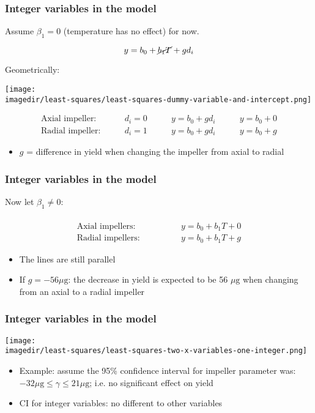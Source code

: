 \begin{frame}\frametitle{Integer variables in the model}

	Assume $\beta_1 = 0$ (temperature has no effect) for now.
	
	$$y = b_0 + \cancel{b_1 T} + g d_i$$
	
	Geometrically: \vspace{-0.5cm}
	\begin{center}
		\texttt{[image: \\imagedir/least-squares/least-squares-dummy-variable-and-intercept.png]}
	\end{center}
	$$
	\begin{array}{llll}
		\text{Axial impeller:} \qquad & d_i=0 &\qquad y = b_0 + gd_i &\qquad y = b_0 + 0 \\
		\text{Radial impeller:} \qquad & d_i=1 &\qquad y = b_0 + gd_i & \qquad y = b_0 + g
	\end{array}
	$$
	\begin{itemize}
		\item	$g$ = difference in yield when changing the impeller from axial to radial
	\end{itemize}
\end{frame}

\begin{frame}\frametitle{Integer variables in the model}

	Now let $\beta_1 \neq 0$:

	$$
	\begin{array}{ll}
		& \\
		\text{Axial impellers:} \qquad &\qquad y = b_0 + b_1 T + 0 \\
		\text{Radial impellers:} \qquad &\qquad y = b_0 + b_1 T + g
	\end{array}
	$$
	\begin{itemize}
		\item	The lines are still parallel
		\item	If $g = -56 \mu\text{g}$: the decrease in yield is expected to be 56 $\mu\text{g}$ when changing from an axial to a radial impeller
	\end{itemize}
\end{frame}

\begin{frame}\frametitle{Integer variables in the model}
	\begin{center}
		\texttt{[image: \\imagedir/least-squares/least-squares-two-x-variables-one-integer.png]}
	\end{center}
	\begin{itemize}
		\item	Example: assume the 95\% confidence interval for impeller parameter was: $ -32 \mu\text{g} \leq \gamma \leq 21 \mu\text{g}$; i.e. no significant effect on yield
		\item	CI for integer variables: no different to other variables
	\end{itemize}
\end{frame}

